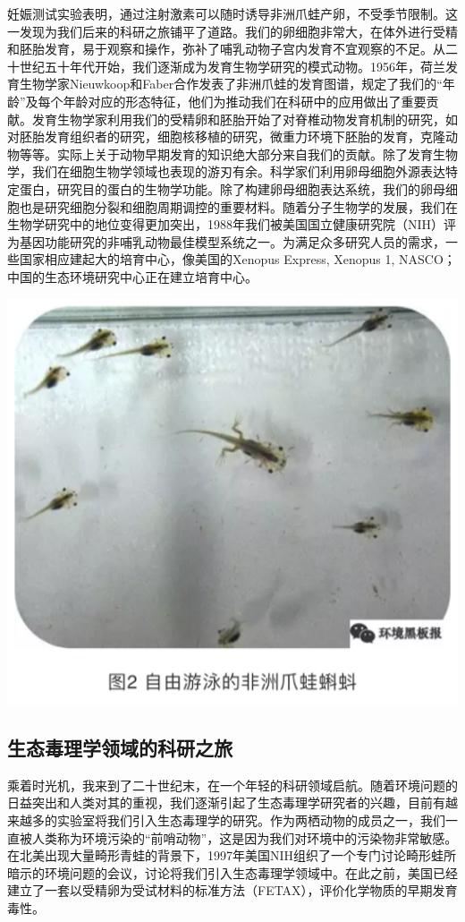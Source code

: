 \documentclass[]{book}
\begin{document}
妊娠测试实验表明，通过注射激素可以随时诱导非洲爪蛙产卵，不受季节限制。这一发现为我们后来的科研之旅铺平了道路。我们的卵细胞非常大，在体外进行受精和胚胎发育，易于观察和操作，弥补了哺乳动物子宫内发育不宜观察的不足。从二十世纪五十年代开始，我们逐渐成为发育生物学研究的模式动物。1956年，荷兰发育生物学家Nieuwkoop和Faber合作发表了非洲爪蛙的发育图谱，规定了我们的``年龄''及每个年龄对应的形态特征，他们为推动我们在科研中的应用做出了重要贡献。发育生物学家利用我们的受精卵和胚胎开始了对脊椎动物发育机制的研究，如对胚胎发育组织者的研究，细胞核移植的研究，微重力环境下胚胎的发育，克隆动物等等。实际上关于动物早期发育的知识绝大部分来自我们的贡献。除了发育生物学，我们在细胞生物学领域也表现的游刃有余。科学家们利用卵母细胞外源表达特定蛋白，研究目的蛋白的生物学功能。除了构建卵母细胞表达系统，我们的卵母细胞也是研究细胞分裂和细胞周期调控的重要材料。随着分子生物学的发展，我们在生物学研究中的地位变得更加突出，1988年我们被美国国立健康研究院（NIH）评为基因功能研究的非哺乳动物最佳模型系统之一。为满足众多研究人员的需求，一些国家相应建起大的培育中心，像美国的Xenopus
Express, Xenopus 1, NASCO；中国的生态环境研究中心正在建立培育中心。

\includegraphics[width=6.67in]{images/qingwa2}

\subsection{生态毒理学领域的科研之旅}

乘着时光机，我来到了二十世纪末，在一个年轻的科研领域启航。随着环境问题的日益突出和人类对其的重视，我们逐渐引起了生态毒理学研究者的兴趣，目前有越来越多的实验室将我们引入生态毒理学的研究。作为两栖动物的成员之一，我们一直被人类称为环境污染的``前哨动物''，这是因为我们对环境中的污染物非常敏感。在北美出现大量畸形青蛙的背景下，1997年美国NIH组织了一个专门讨论畸形蛙所暗示的环境问题的会议，讨论将我们引入生态毒理学领域中。在此之前，美国已经建立了一套以受精卵为受试材料的标准方法（FETAX），评价化学物质的早期发育毒性。
\end{document}
